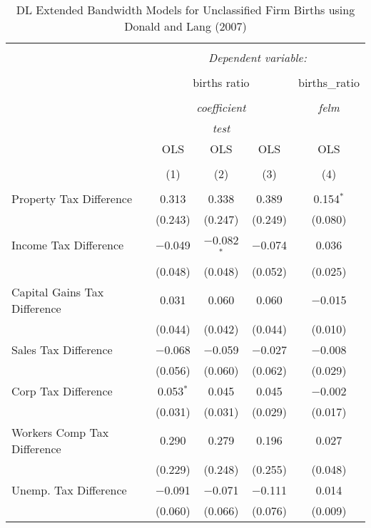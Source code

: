
\begin{table}[!htbp] \centering 
  \caption{DL Extended Bandwidth Models for  Unclassified Firm Births using Donald and Lang (2007)} 
  \label{} 
\begin{tabular}{@{\extracolsep{5pt}}lcccc} 
\\[-1.8ex]\hline 
\hline \\[-1.8ex] 
 & \multicolumn{4}{c}{\textit{Dependent variable:}} \\ 
\cline{2-5} 
\\[-1.8ex] & \multicolumn{3}{c}{births ratio} & births\_ratio \\ 
\\[-1.8ex] & \multicolumn{3}{c}{\textit{coefficient}} & \textit{felm} \\ 
 & \multicolumn{3}{c}{\textit{test}} & \textit{} \\ 
 & OLS & OLS & OLS & OLS \\ 
\\[-1.8ex] & (1) & (2) & (3) & (4)\\ 
\hline \\[-1.8ex] 
 Property Tax Difference & 0.313 & 0.338 & 0.389 & 0.154$^{*}$ \\ 
  & (0.243) & (0.247) & (0.249) & (0.080) \\ 
  Income Tax Difference & $-$0.049 & $-$0.082$^{*}$ & $-$0.074 & 0.036 \\ 
  & (0.048) & (0.048) & (0.052) & (0.025) \\ 
  Capital Gains Tax Difference & 0.031 & 0.060 & 0.060 & $-$0.015 \\ 
  & (0.044) & (0.042) & (0.044) & (0.010) \\ 
  Sales Tax Difference & $-$0.068 & $-$0.059 & $-$0.027 & $-$0.008 \\ 
  & (0.056) & (0.060) & (0.062) & (0.029) \\ 
  Corp Tax Difference & 0.053$^{*}$ & 0.045 & 0.045 & $-$0.002 \\ 
  & (0.031) & (0.031) & (0.029) & (0.017) \\ 
  Workers Comp Tax Difference & 0.290 & 0.279 & 0.196 & 0.027 \\ 
  & (0.229) & (0.248) & (0.255) & (0.048) \\ 
  Unemp. Tax Difference & $-$0.091 & $-$0.071 & $-$0.111 & 0.014 \\ 
  & (0.060) & (0.066) & (0.076) & (0.009) \\ 

\end{tabular}
\end{table}
